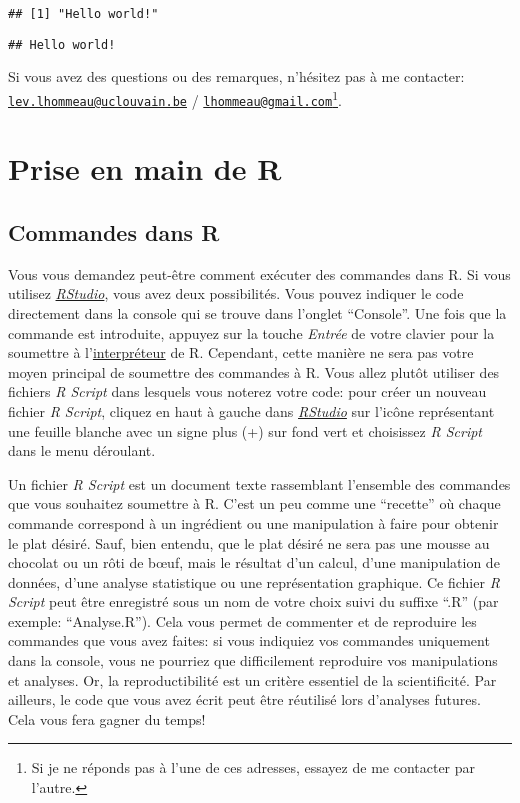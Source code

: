 \documentclass[
]{book}
\begin{document}
\begin{verbatim}
## [1] "Hello world!"
\end{verbatim}

\begin{verbatim}
## Hello world!
\end{verbatim}

Si vous avez des questions ou des remarques, n'hésitez pas à me contacter: \href{mailto:lev.lhommeau@uclouvain.be}{\nolinkurl{lev.lhommeau@uclouvain.be}} / \href{mailto:lhommeau@gmail.com}{\nolinkurl{lhommeau@gmail.com}}\footnote{Si je ne réponds pas à l'une de ces adresses, essayez de me contacter par l'autre.}.

\hypertarget{Priseenmain}{%
\chapter{Prise en main de R}\label{Priseenmain}}

\hypertarget{Commandes}{%
\section{Commandes dans R}\label{Commandes}}

Vous vous demandez peut-être comment exécuter des commandes dans R. Si vous utilisez \href{https://posit.co/}{\emph{RStudio}}, vous avez deux possibilités. Vous pouvez indiquer le code directement dans la console qui se trouve dans l'onglet ``Console''. Une fois que la commande est introduite, appuyez sur la touche \emph{Entrée} de votre clavier pour la soumettre à l'\href{https://fr.wikipedia.org/wiki/Interpr\%C3\%A8te_(informatique)}{interpréteur} de R. Cependant, cette manière ne sera pas votre moyen principal de soumettre des commandes à R. Vous allez plutôt utiliser des fichiers \emph{R Script} dans lesquels vous noterez votre code: pour créer un nouveau fichier \emph{R Script}, cliquez en haut à gauche dans \href{https://posit.co/}{\emph{RStudio}} sur l'icône représentant une feuille blanche avec un signe plus (+) sur fond vert et choisissez \emph{R Script} dans le menu déroulant.

Un fichier \emph{R Script} est un document texte rassemblant l'ensemble des commandes que vous souhaitez soumettre à R. C'est un peu comme une ``recette'' où chaque commande correspond à un ingrédient ou une manipulation à faire pour obtenir le plat désiré. Sauf, bien entendu, que le plat désiré ne sera pas une mousse au chocolat ou un rôti de bœuf, mais le résultat d'un calcul, d'une manipulation de données, d'une analyse statistique ou une représentation graphique. Ce fichier \emph{R Script} peut être enregistré sous un nom de votre choix suivi du suffixe ``.R'' (par exemple: ``Analyse.R''). Cela vous permet de commenter et de reproduire les commandes que vous avez faites: si vous indiquiez vos commandes uniquement dans la console, vous ne pourriez que difficilement reproduire vos manipulations et analyses. Or, la reproductibilité est un critère essentiel de la scientificité. Par ailleurs, le code que vous avez écrit peut être réutilisé lors d'analyses futures. Cela vous fera gagner du temps!
\end{document}

